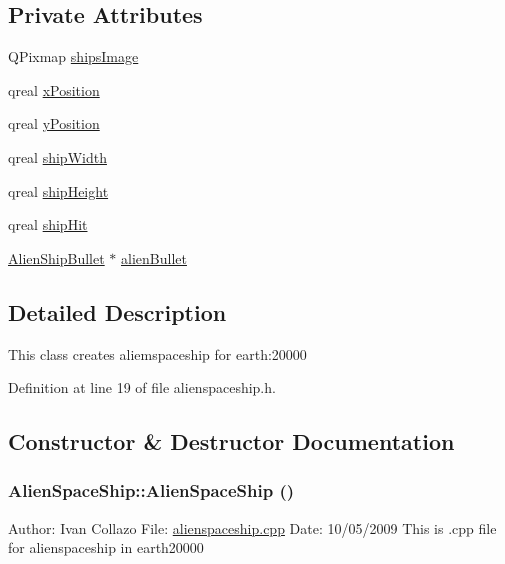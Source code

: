 \subsection*{Private Attributes}
\begin{DoxyCompactItemize}
\item 
QPixmap \hyperlink{class_alien_space_ship_abab065a55af3cfac98529eeec94190f8}{shipsImage}
\item 
qreal \hyperlink{class_alien_space_ship_a4539a2e1dba8598cbc42fa262f586acd}{xPosition}
\item 
qreal \hyperlink{class_alien_space_ship_acb7a7bbfb71e3673768212f9239ea3b3}{yPosition}
\item 
qreal \hyperlink{class_alien_space_ship_a752697ea2f71e8d4675c694ac242e6f9}{shipWidth}
\item 
qreal \hyperlink{class_alien_space_ship_a2d4ed13f6240af32719ffcaa25d6586b}{shipHeight}
\item 
qreal \hyperlink{class_alien_space_ship_a1834c3be5efc26ca49451a3b04ec8785}{shipHit}
\item 
\hyperlink{class_alien_ship_bullet}{AlienShipBullet} $\ast$ \hyperlink{class_alien_space_ship_a9b5c9dec5c5a39242d75725560e63811}{alienBullet}
\end{DoxyCompactItemize}


\subsection{Detailed Description}
This class creates aliemspaceship for earth:20000 

Definition at line 19 of file alienspaceship.h.

\subsection{Constructor \& Destructor Documentation}
\hypertarget{class_alien_space_ship_a09dfa4a07e14e135b09acd168f42db7c}{
\subsubsection[{AlienSpaceShip}]{\setlength{\rightskip}{0pt plus 5cm}AlienSpaceShip::AlienSpaceShip ()}}
\label{class_alien_space_ship_a09dfa4a07e14e135b09acd168f42db7c}
Author: Ivan Collazo File: \hyperlink{alienspaceship_8cpp}{alienspaceship.cpp} Date: 10/05/2009 This is .cpp file for alienspaceship in earth20000

